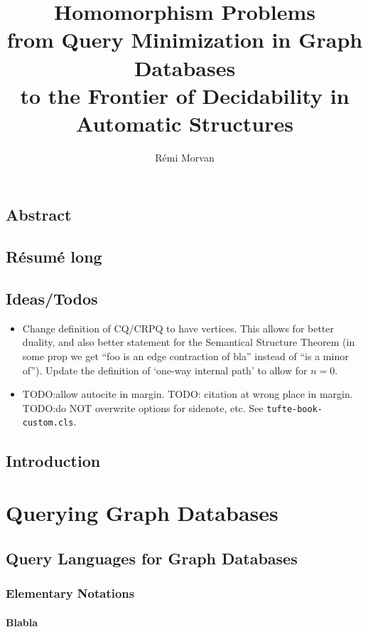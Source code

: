 \documentclass[a4paper,sfsidenotes,twoside,justified,nobib]{tufte-book-custom}
\title[Homomorphism Problems]{Homomorphism Problems\\from Query Minimization in Graph Databases\\ to the Frontier of Decidability in Automatic Structures}
\author{Rémi Morvan}
\begin{document}
\frontmatter




\mainmatter
\chapter*{Abstract}

\chapter*{Résumé long}

\chapter*{Ideas/Todos}

\begin{itemize}
	\item Change definition of CQ/CRPQ to have vertices. This allows for better duality,
		and also better statement for the Semantical Structure Theorem (in some prop we get
		``foo is an edge contraction of bla'' instead of ``is a minor of'').
		Update the definition of `one-way internal path' to allow for $n=0$.
	\item TODO:allow autocite in margin.
		TODO: citation at wrong place in margin.
		TODO:do NOT overwrite options for sidenote, etc.
		See \texttt{tufte-book-custom.cls}.
\end{itemize}

\chapter{Introduction}

\part{Querying Graph Databases}

\chapter{Query Languages for Graph Databases}

\section{Elementary Notations}

\subsection{Blabla}
\end{document}
